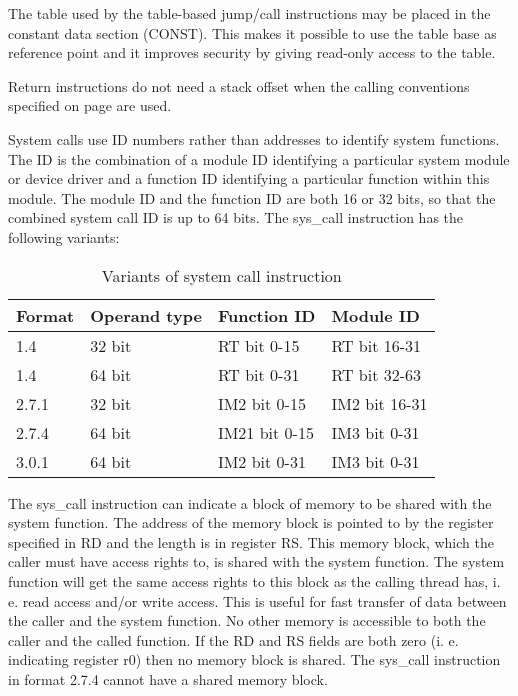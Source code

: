 \documentclass[forwardcom.tex]{subfiles}
\begin{document}
The table used by the table-based jump/call instructions may be placed in the constant data section (CONST). This makes it possible to use the table base as reference point and it improves security by giving read-only access to the table.
\vspace{2mm}

Return instructions do not need a stack offset when the calling conventions specified on page \pageref{functionCallingConventions} are used.
\vspace{2mm}

\label{systemCallInstruction}
System calls use ID numbers rather than addresses to identify system functions. 
The ID is the combination of a module ID identifying a particular system module or device driver and a function ID identifying a particular function within this module. The module ID and the function ID are both 16 or 32 bits, so that the combined system call ID is up to 64 bits.
The sys\_call instruction has the following variants:

\begin{longtable}
{|p{30mm}|p{30mm}|p{30mm}|p{30mm}|}
\caption{Variants of system call instruction}
\label{table:syscallInstructions}
\endfirsthead
\endhead
\hline
Format & Operand type & Function ID & Module ID \\
\hline
1.4 & 32 bit & RT bit 0-15 & RT bit 16-31  \\
\hline
1.4 & 64 bit & RT bit 0-31 & RT bit 32-63  \\
\hline
2.7.1 & 32 bit & IM2 bit 0-15 & IM2 bit 16-31 \\
\hline
2.7.4 & 64 bit & IM21 bit 0-15 & IM3 bit 0-31 \\
\hline
3.0.1 & 64 bit & IM2 bit 0-31 & IM3 bit 0-31 \\
\hline
\end{longtable}

The sys\_call instruction can indicate a block of memory to be shared with the system function. The address of the memory block is pointed to by the register specified in RD and the length is in register RS. This memory block, which the caller must have access rights to, is shared with the system function. The system function will get the same access rights to this block as the calling thread has, i. e. read access and/or write access. This is useful for fast transfer of data between the caller and the system function. No other memory is accessible to both the caller and the called function. If the RD and RS fields are both zero (i. e. indicating register r0) then no memory block is shared. The sys\_call instruction in format 2.7.4 cannot have a shared memory block.
\vspace{2mm}
\end{document}
